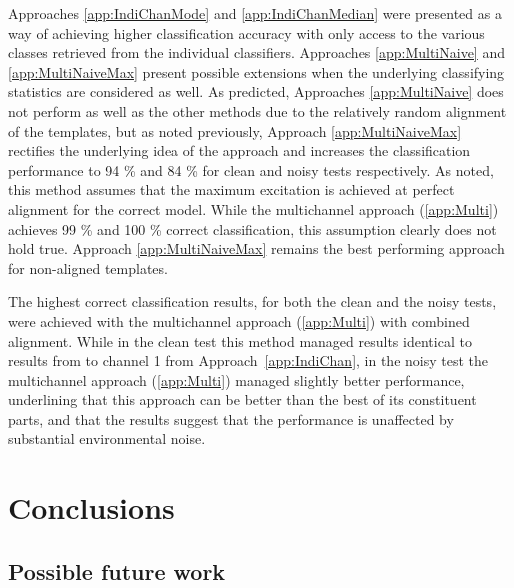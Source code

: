 Approaches \ref{app:IndiChanMode} and \ref{app:IndiChanMedian} were presented as a way of achieving higher classification accuracy with only access to the various classes retrieved from the individual classifiers. Approaches \ref{app:MultiNaive} and \ref{app:MultiNaiveMax} present possible extensions when the underlying classifying statistics are considered as well. As predicted, Approaches \ref{app:MultiNaive} does not perform as well as the other methods due to the relatively random alignment of the templates, but as noted previously, Approach \ref{app:MultiNaiveMax} rectifies the underlying idea of the approach and increases the classification performance to 94 \% and 84 \% for clean and noisy tests respectively. As noted, this method assumes that the maximum excitation is achieved at perfect alignment for the correct model. While the multichannel approach (\ref{app:Multi}) achieves 99 \% and 100 \% correct classification, this assumption clearly does not hold true. Approach \ref{app:MultiNaiveMax} remains the best performing approach for non-aligned templates.

The highest correct classification results, for both the clean and the noisy tests, were achieved with the multichannel approach (\ref{app:Multi}) with combined alignment. While in the clean test this method managed results identical to results from to channel 1 from Approach~\ref{app:IndiChan}, in the noisy test the multichannel approach (\ref{app:Multi}) managed slightly better performance, underlining that this approach can be better than the best of its constituent parts, and that the results suggest that the performance is unaffected by substantial environmental noise.

\section{Conclusions}

\subsection{Possible future work}


